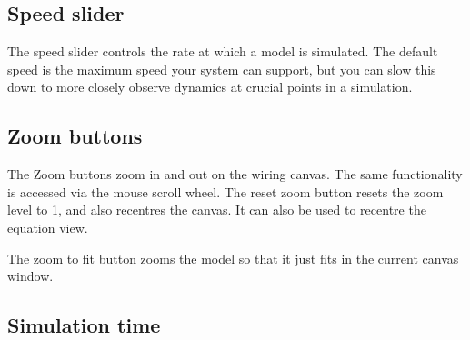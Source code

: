 
\subsection{Speed slider}

\label{Speedslider}
\begin{center}
\par\end{center}

The speed slider controls the rate at which a model is simulated.
The default speed is the maximum speed your system can support, but
you can slow this down to more closely observe dynamics at crucial
points in a simulation.

\subsection{Zoom buttons}

\label{ZoomButtons}
\begin{center}
\par\end{center}

The Zoom buttons zoom in and out on the wiring canvas. The same functionality
is accessed via the mouse scroll wheel. The reset zoom button 
resets the zoom level to 1, and also recentres the canvas. It can
also be used to recentre the equation view.

The zoom to fit button zooms the model so that it just fits in the
current canvas window.

\subsection{Simulation time}

